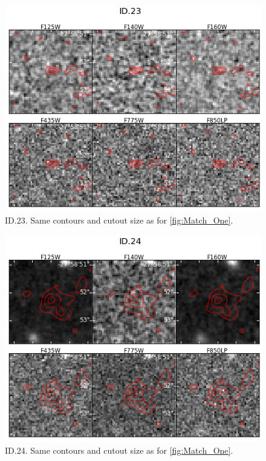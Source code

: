 \begin{figure}[tbp]
\centering \includegraphics[width=160mm]{Matched/ASPECS_Cutout_22.jpg}
\caption{ID.23. Same contours and cutout size as for \ref{fig:Match_One}.}
\label{fig:Match_Three}
\end{figure}

\begin{figure}[tbp]
\centering \includegraphics[width=160mm]{Matched/ASPECS_Cutout_23.jpg}
\caption{ID.24. Same contours and cutout size as for \ref{fig:Match_One}.}
\label{fig:Match_Three}
\end{figure}


